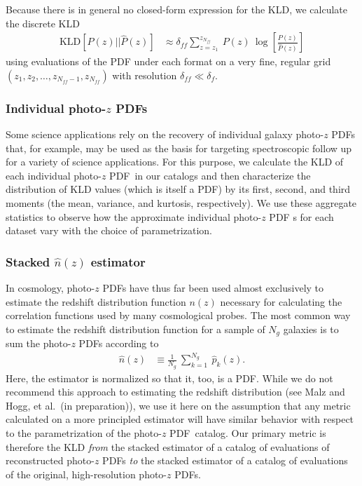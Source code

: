 \documentclass[\docopts]{\docclass}
\newcommand{\pz}{photo-$z$ PDF}
\begin{document}
Because there is in general no closed-form expression for the KLD, we calculate 
the discrete KLD
\begin{align}
  \label{eq:kld_approx}
  \mathrm{KLD}[P(z) || \hat{P}(z)] &\approx 
\delta_{ff}\sum_{z=z_{1}}^{z_{N_{ff}}}\ P(z)\ 
\log\left[\frac{P(z)}{\hat{P}(z)}\right]
\end{align}
using evaluations of the PDF under each format on a very fine, regular grid 
$(z_{1}, z_{2}, \dots, z_{N_{ff}-1}, z_{N_{ff}})$ with resolution 
$\delta_{ff}\ll\delta_{f}$.

\subsubsection{Individual \pz s}
\label{sec:individual_metric}

Some science applications rely on the recovery of individual galaxy \pz s that, 
for example, may be used as the basis for targeting spectroscopic follow up for 
a variety of science applications.
For this purpose, we calculate the KLD of each individual \pz\ in our catalogs 
and then characterize the distribution of KLD values (which is itself a PDF) by 
its first, second, and third moments (the mean, variance, and kurtosis, 
respectively).
We use these aggregate statistics to observe how the approximate individual \pz 
s for each dataset vary with the choice of parametrization.

\subsubsection{Stacked $\hat{n}(z)$ estimator}
\label{sec:stacked_metric}

In cosmology, \pz s have thus far been used almost exclusively to estimate the 
redshift distribution function $n(z)$ necessary for calculating the correlation 
functions used by many cosmological probes.
The most common way to estimate the redshift distribution function for a sample 
of $N_{g}$ galaxies is to sum the \pz s according to
\begin{align}
  \label{eq:nz}
  \hat{n}(z) &\equiv \frac{1}{N_{g}}\ \sum_{k=1}^{N_{g}}\ \hat{p}_{k}(z).
\end{align}
Here, the estimator is normalized so that it, too, is a PDF.
While we do not recommend this approach to estimating the redshift distribution 
(see Malz and Hogg, et al.\ (in preparation)), we use it here on the assumption 
that any metric calculated on a more principled estimator will have similar 
behavior with respect to the parametrization of the \pz\ catalog.
Our primary metric is therefore the KLD \textit{from} the stacked estimator of 
a catalog of evaluations of reconstructed \pz s \textit{to} the stacked 
estimator of a catalog of evaluations of the original, high-resolution \pz s.
\end{document}
